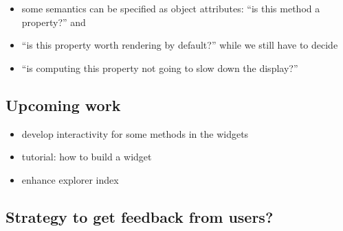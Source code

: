 \documentclass{deliverablereport}
\begin{document}
\begin{itemize}
\item some semantics can be specified as object attributes: ``is this method a
  property?'' and
  \item ``is this property worth rendering by default?''  while we
    still have to decide
  \item ``is computing this property not going to slow down the display?''
\end{itemize}

\subsection{Upcoming work}

\begin{itemize}
\item develop interactivity for some methods in the widgets
\item tutorial: how to build a widget
\item enhance explorer index
\end{itemize}

\subsection{Strategy to get feedback from users?}


\appendix

\end{document}

